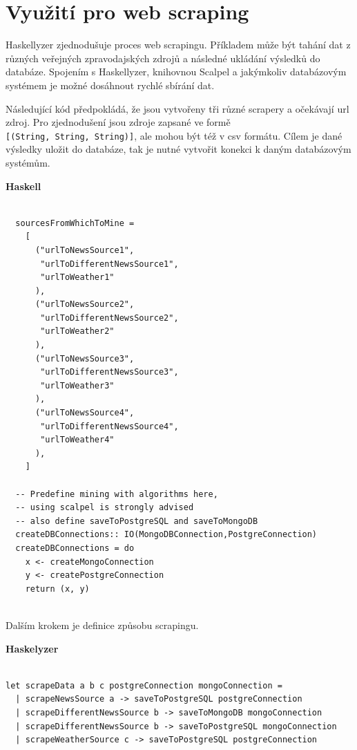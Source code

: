 \documentclass[male,czech]{kithesis}
\newcommand{\haskellInline}[1]{\colorbox{gray!10}{\texttt{#1}}}
\begin{document}
\section{Využití pro web scraping}

Haskellyzer zjednodušuje proces web scrapingu. 
Příkladem může být tahání dat z různých veřejných zpravodajských zdrojů a 
následné ukládání výsledků do databáze. 
Spojením s Haskellyzer, knihovnou Scalpel a 
jakýmkoliv databázovým systémem je možné dosáhnout rychlé sbírání dat.

Následující kód předpokládá, 
že jsou vytvořeny tři různé scrapery a 
očekávají url zdroj.
Pro zjednodušení jsou zdroje zapsané ve formě \\ 
\haskellInline{[(String, String, String)]}, 
ale mohou být též v csv formátu.
Cílem je dané výsledky uložit do databáze,
tak je nutné vytvořit konekci k daným databázovým systémům. 

\textbf{Haskell}
\begin{verbatim}

  sourcesFromWhichToMine = 
    [
      ("urlToNewsSource1", 
       "urlToDifferentNewsSource1",
       "urlToWeather1"
      ),
      ("urlToNewsSource2", 
       "urlToDifferentNewsSource2",
       "urlToWeather2"
      ),
      ("urlToNewsSource3", 
       "urlToDifferentNewsSource3",
       "urlToWeather3"
      ),
      ("urlToNewsSource4", 
       "urlToDifferentNewsSource4",
       "urlToWeather4"
      ),
    ]
  
  -- Predefine mining with algorithms here, 
  -- using scalpel is strongly advised
  -- also define saveToPostgreSQL and saveToMongoDB
  createDBConnections:: IO(MongoDBConnection,PostgreConnection)
  createDBConnections = do
    x <- createMongoConnection 
    y <- createPostgreConnection 
    return (x, y)
  
\end{verbatim}

Dalším krokem je definice způsobu scrapingu. 

\textbf{Haskelyzer}
\begin{verbatim}

let scrapeData a b c postgreConnection mongoConnection = 
  | scrapeNewsSource a -> saveToPostgreSQL postgreConnection
  | scrapeDifferentNewsSource b -> saveToMongoDB mongoConnection
  | scrapeDifferentNewsSource b -> saveToPostgreSQL mongoConnection
  | scrapeWeatherSource c -> saveToPostgreSQL postgreConnection

\end{verbatim}
\end{document}
